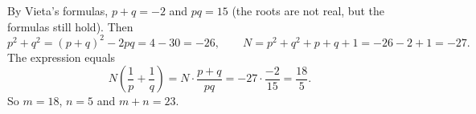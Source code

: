 By Vieta's formulas, $p+q=-2$ and $pq=15$ (the roots are not real, but the formulas still hold). Then
\[p^2+q^2=(p+q)^2-2pq=4-30=-26,\qquad N=p^2+q^2+p+q+1=-26-2+1=-27.\]
The expression equals
\[N\left(\dfrac1p+\dfrac1q\right)=N\cdot\dfrac{p+q}{pq}=-27\cdot\dfrac{-2}{15}=\dfrac{18}{5}.\]
So $m=18$, $n=5$ and $m+n=\boxed{23}$.
